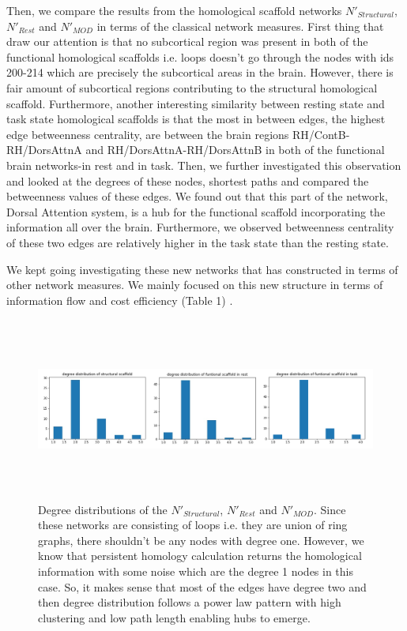 \documentclass[9pt,twocolumn,twoside,lineno]{pnas-new}
\begin{document}
Then, we compare the results from the homological scaffold networks $N'_{Structural}$, $N'_{Rest}$ and $N'_{MOD}$ in terms of the classical network measures. First thing that draw our attention is that no subcortical region was present in both of the functional homological scaffolds i.e. loops doesn't go through the nodes with ids 200-214 which are precisely the subcortical areas  in the brain. However, there is fair amount of subcortical regions contributing to the structural homological scaffold. Furthermore, another interesting similarity between resting state and task state homological scaffolds is that the most in between edges, the highest edge betweenness centrality, are between the brain regions RH/ContB-RH/DorsAttnA and RH/DorsAttnA-RH/DorsAttnB in both of the functional brain networks-in rest and in task. Then, we further investigated this observation and looked at the degrees of these nodes, shortest paths and compared the betweenness values of these edges. We found out that this part of the network, Dorsal Attention system, is a hub for the functional scaffold incorporating the information all over the brain. Furthermore, we observed betweenness centrality of these two edges are relatively higher in the task state than the resting state.

We kept going investigating these new networks that has constructed in terms of other network measures. We mainly focused on this new structure in terms of information flow and cost efficiency (Table 1) .

\begin{figure}%
\centering
\includegraphics[width=16cm,height=6cm]{degreedists.png}
\caption{Degree distributions of the $N'_{Structural}$, $N'_{Rest}$ and $N'_{MOD}$. Since these networks are consisting of loops i.e. they are union of ring graphs, there shouldn't be any nodes with degree one. However, we know that persistent homology calculation returns the homological information with some noise which are the degree 1 nodes in this case. So, it makes sense that most of the edges have degree two and then degree distribution follows a power law pattern with high clustering and low path length enabling hubs to emerge.}
\end{figure}
\end{document}
